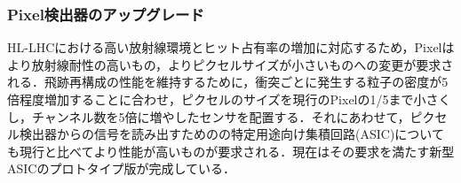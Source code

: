 \subsubsection*{Pixel検出器のアップグレード}
HL-LHCにおける高い放射線環境とヒット占有率の増加に対応するため，Pixelはより放射線耐性の高いもの，よりピクセルサイズが小さいものへの変更が要求される．飛跡再構成の性能を維持するために，衝突ごとに発生する粒子の密度が5倍程度増加することに合わせ，ピクセルのサイズを現行のPixelの1/5まで小さくし，チャンネル数を5倍に増やしたセンサを配置する．それにあわせて，ピクセル検出器からの信号を読み出すためのの特定用途向け集積回路(ASIC)についても現行と比べてより性能が高いものが要求される．現在はその要求を満たす新型ASICのプロトタイプ版が完成している．\par




 
